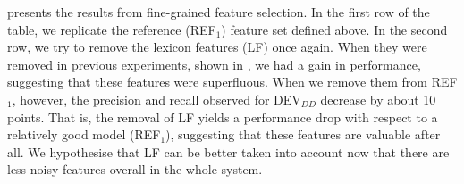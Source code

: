 \documentclass[output=paper,modfonts]{langscibook}
\begin{document}
 presents the results from fine-grained feature selection.
In the first row of the table, we replicate the reference (\textsc{REF$_1$}) feature set defined above.
In the second row, we try to remove the lexicon features (\textsc{LF}) once again. When they were removed in previous experiments, shown in , we had a gain in performance, suggesting that these features were superfluous. When we remove them from \textsc{REF$_1$}, however, the precision and recall observed for \textsc{DEV}$_{DD}$ decrease by about 10 points. That is, the removal of \textsc{LF} yields a performance drop with respect to a relatively good model (\textsc{REF$_1$}), suggesting that these features are valuable after all. We hypothesise that \textsc{LF} can be better taken into account now that there are less noisy features overall in the whole system.
\end{document}
